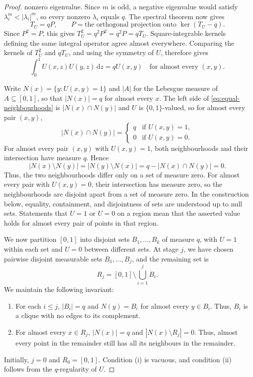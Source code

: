 \documentclass[11pt]{article}
\theoremstyle{remark}
\numberwithin{equation}{section}
\newcommand{\dd}{\,\mathrm d}
\newcommand{\Tker}[1]{T_{#1}}
\begin{document}
\begin{proof}
  nonzero eigenvalue. Since $m$ is odd, a negative eigenvalue would satisfy
  $\lambda_i^m<|\lambda_i|^m$, so every nonzero $\lambda_i$ equals $q$.
  The spectral theorem now gives
  \[
    \Tker U=qP,
    \qquad P=\text{the orthogonal projection onto }\ker(\Tker U-q).
  \]
  Since $P^2=P$, this gives $\Tker U^2=q^2P^2=q^2P=q\Tker U$.
  Square-integrable kernels defining the same integral operator agree
  almost everywhere. Comparing the kernels of $\Tker U^2$ and
  $q\Tker U$, and using the symmetry of $U$, therefore gives
  \begin{equation}\label{eq:equal-neighbourhoods}
    \int_0^1 U(x,z)U(y,z)\dd z=qU(x,y)
    \quad\text{for almost every }(x,y).
  \end{equation}

  Write $N(x)=\{y:U(x,y)=1\}$ and $|A|$ for the Lebesgue measure of $A\subseteq[0,1]$, so that $|N(x)|=q$ for almost every $x$.
  The left side of \eqref{eq:equal-neighbourhoods} is $|N(x)\cap N(y)|$ and $U$ is $\{0,1\}$-valued, so for almost every pair $(x,y)$,
  \[
    \bigl|N(x)\cap N(y)\bigr|
    =\begin{cases}
      q&\text{if }U(x,y)=1,\\
      0&\text{if }U(x,y)=0.
    \end{cases}
  \]
  For almost every pair $(x,y)$ with $U(x,y)=1$, both neighbourhoods
  and their intersection have measure $q$. Hence
  \[
    |N(x)\setminus N(y)|=|N(y)\setminus N(x)|
    =q-|N(x)\cap N(y)|=0.
  \]
  Thus, the two neighbourhoods differ only on a set of measure zero.
  For almost every pair with $U(x,y)=0$, their intersection has measure
  zero, so the neighbourhoods are disjoint apart from a set of measure zero.
  In the construction below, equality, containment, and disjointness of sets
  are understood up to null sets. Statements that $U=1$ or $U=0$ on a region mean that the
  asserted value holds for almost every pair of points in that region.

  We now partition $[0,1]$ into disjoint sets $B_1,\ldots,B_k$ of
  measure $q$, with $U=1$ within each set and $U=0$ between different
  sets. At stage $j$, we have chosen pairwise disjoint measurable sets
  $B_1,\ldots,B_j$, and the remaining set is
  \[
    R_j=[0,1]\setminus\bigcup_{i=1}^j B_i.
  \]
  We maintain the following invariant:
  \begin{enumerate}[label=(\roman*)]
    \item For each $i\le j$, $|B_i|=q$ and $N(y)=B_i$ for almost
      every $y\in B_i$. Thus, $B_i$ is a clique with no edges to its
      complement.
    \item For almost every $x\in R_j$, $|N(x)|=q$ and
      $|N(x)\setminus R_j|=0$. Thus, almost every point in the
      remainder still has all its neighbours in the remainder.
  \end{enumerate}
  Initially, $j=0$ and $R_0=[0,1]$. Condition (i) is vacuous, and
  condition (ii) follows from the $q$-regularity of $U$.


\end{proof}
\end{document}
